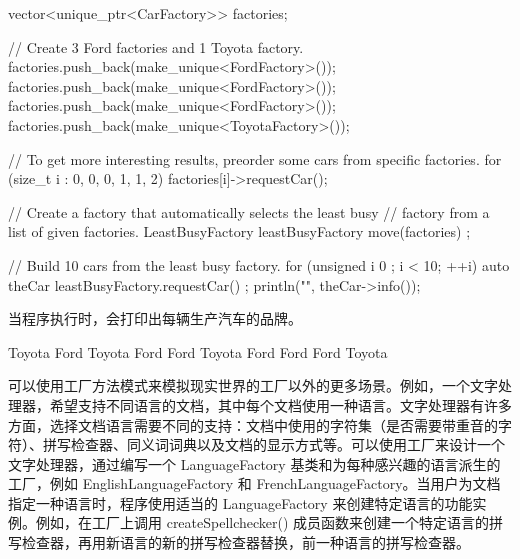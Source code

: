 \begin{cpp}
vector<unique_ptr<CarFactory>> factories;

// Create 3 Ford factories and 1 Toyota factory.
factories.push_back(make_unique<FordFactory>());
factories.push_back(make_unique<FordFactory>());
factories.push_back(make_unique<FordFactory>());
factories.push_back(make_unique<ToyotaFactory>());

// To get more interesting results, preorder some cars from specific factories.
for (size_t i : {0, 0, 0, 1, 1, 2}) { factories[i]->requestCar(); }

// Create a factory that automatically selects the least busy
// factory from a list of given factories.
LeastBusyFactory leastBusyFactory { move(factories) };

// Build 10 cars from the least busy factory.
for (unsigned i { 0 }; i < 10; ++i) {
    auto theCar { leastBusyFactory.requestCar() };
    println("{}", theCar->info());
}
\end{cpp}

当程序执行时，会打印出每辆生产汽车的品牌。

\begin{shell}
Toyota
Ford
Toyota
Ford
Ford
Toyota
Ford
Ford
Ford
Toyota
\end{shell}


可以使用工厂方法模式来模拟现实世界的工厂以外的更多场景。例如，一个文字处理器，希望支持不同语言的文档，其中每个文档使用一种语言。文字处理器有许多方面，选择文档语言需要不同的支持：文档中使用的字符集（是否需要带重音的字符）、拼写检查器、同义词词典以及文档的显示方式等。可以使用工厂来设计一个文字处理器，通过编写一个 LanguageFactory 基类和为每种感兴趣的语言派生的工厂，例如 EnglishLanguageFactory 和 FrenchLanguageFactory。当用户为文档指定一种语言时，程序使用适当的 LanguageFactory 来创建特定语言的功能实例。例如，在工厂上调用 createSpellchecker() 成员函数来创建一个特定语言的拼写检查器，再用新语言的新的拼写检查器替换，前一种语言的拼写检查器。







